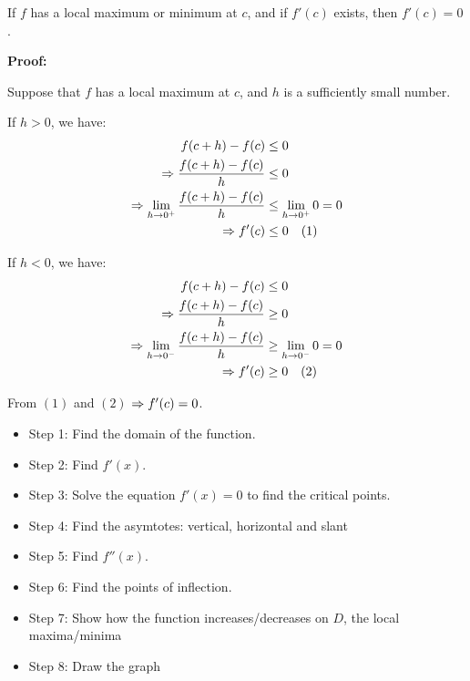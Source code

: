         \par If $f$ has a local maximum or minimum at $c$, and if $f'(c)$ exists, then
        $f'(c) = 0$.
        \small{
            \par \textbf{Proof:}
            \par Suppose that $f$ has a local maximum at $c$, and $h$ is a sufficiently
            small number.
            \par If $h > 0$, we have:
            \begin{alignat*}{2}
                f(c + h) - f(c) &\leq 0 \\
                \Rightarrow \frac{f(c + h) - f(c)}{h} &\leq 0 \\
                \Rightarrow \lim_{h \to 0^{+}} \frac{f(c + h) - f(c)}{h}
                    &\leq \lim_{h \to 0^{+}} 0 = 0 \\
                \Rightarrow f'(c) &\leq 0 \quad (1)
            \end{alignat*}
            \par If $h < 0$, we have:
            \begin{alignat*}{2}
                f(c + h) - f(c) &\leq 0 \\
                \Rightarrow \frac{f(c + h) - f(c)}{h} &\geq 0 \\
                \Rightarrow \lim_{h \to 0^{-}} \frac{f(c + h) - f(c)}{h}
                    &\geq \lim_{h \to 0^{-}} 0 = 0 \\
                \Rightarrow f'(c) &\geq 0 \quad (2)
            \end{alignat*}
            \par From $(1)$ and $(2)$ \quad $\Rightarrow f'(c) = 0$.
        }



    \begin{itemize}
        \item Step 1: Find the domain of the function.
        \item Step 2: Find $f'(x)$.
        \item Step 3: Solve the equation $f'(x) = 0$ to find the critical points.
        \item Step 4: Find the asymtotes: vertical, horizontal and slant
        \item Step 5: Find $f''(x)$.
        \item Step 6: Find the points of inflection.
        \item Step 7: Show how the function increases/decreases on $D$, the local
            maxima/minima
        \item Step 8: Draw the graph
    \end{itemize}

